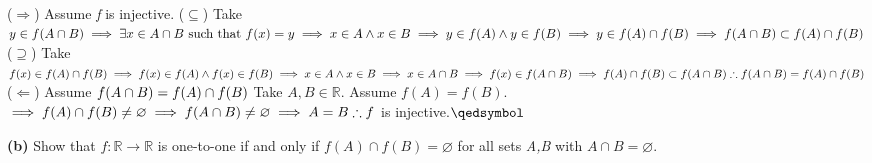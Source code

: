 \documentclass[12pt]{article}
\newcommand{\R}{\mathbb{R}}
\begin{document}
\begin{solution}\newline
($\Rightarrow$) Assume \textit{f} is injective.\newline
($\subseteq$) Take $y\in f(A\cap B)\implies \exists x\in A\cap B\text{ such that } f(x)=y\newline
\implies x\in A\land x\in B\newline
\implies y\in f(A) \land y\in f(B)\newline
\implies y\in f(A)\cap f(B)\newline
\implies f(A\cap B)\subset f(A)\cap f(B)$\newline
($\supseteq$) Take $f(x)\in f(A) \cap f(B)\newline
\implies f(x)\in f(A)\land f(x)\in f(B)\newline
\implies x\in A\land x\in B\newline
\implies x\in A\cap B\newline
\implies f(x) \in f(A\cap B)\newline
\implies f(A)\cap f(B) \subset f(A\cap B)\newline
\therefore f(A\cap B) = f(A)\cap f(B)$\newline
($\Leftarrow$) Assume $f(A\cap B) = f(A)\cap f(B)\newline$
Take $A,B\in\R$. Assume $f(A)=f(B)$.\newline
$\implies f(A)\cap f(B) \neq \varnothing\newline
\implies f(A\cap B)\neq\varnothing\newline
\implies A=B\newline
\therefore f$ is injective.\flushright$\qedsymbol$
\end{solution}
\newpage
\begin{subproblem}\textbf{(b)}
Show that $f:\R\to\R$ is one-to-one if and only if $f(A)\cap f(B) =\varnothing$ for all sets \textit{A,B} with $A\cap B = \varnothing$. 
\end{subproblem}
\end{document}
